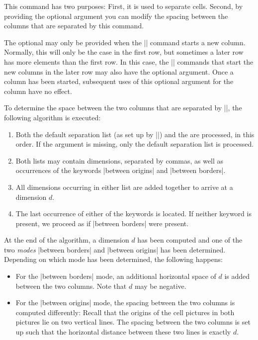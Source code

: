 \begin{command}{\pgfmatrixnextcell{}}
    This command has two purposes: First, it is used to separate cells. Second,
    by providing the optional argument  you can
    modify the spacing between the columns that are separated by this command.

    The optional  may only be provided when the
    |\pgfmatrixnextcell| command starts a new column. Normally, this will only
    be the case in the first row, but sometimes a later row has more elements
    than the first row. In this case, the |\pgfmatrixnextcell| commands that
    start the new columns in the later row may also have the optional argument.
    Once a column has been started, subsequent uses of this optional argument
    for the column have no effect.

    To determine the space between the two columns that are separated by
    |\pgfmatrixnextcell|, the following algorithm is executed:
    \begin{enumerate}
        \item Both the default separation list (as set up by
            |\pgfsetmatrixcolumnsep|) and the  are
            processed, in this order. If the 
            argument is missing, only the default separation list is processed.
        \item Both lists may contain dimensions, separated by commas, as well
            as occurrences of the keywords |between origins| and 
            |between borders|.
        \item All dimensions occurring in either list are added together to
            arrive at a dimension $d$.
        \item The last occurrence of either of the keywords is located. If
            neither keyword is present, we proceed as if |between borders| were
            present.
    \end{enumerate}
    At the end of the algorithm, a dimension $d$ has been computed and one of
    the two \emph{modes} |between borders| and |between origins| has been
    determined. Depending on which mode has been determined, the following
    happens:
    \begin{itemize}
        \item For the |between borders| mode, an additional horizontal space of
            $d$ is added between the two columns. Note that $d$ may be
            negative.
        \item For the |between origins| mode, the spacing between the two
            columns is computed differently: Recall that the origins of the
            cell pictures in both pictures lie on two vertical lines. The
            spacing between the two columns is set up such that the horizontal
            distance between these two lines is exactly $d$.


\end{itemize}
\end{command}
